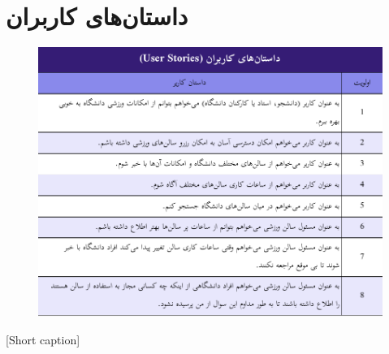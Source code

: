 \section{
داستان‌های کاربران 
}

\begin{center}
  \begin{figure} [h!]
    { \includegraphics[page=1, width=\textwidth]{appandecies/user_stories.pdf}}
  \end{figure}
  [Short caption]{}
\end{center}